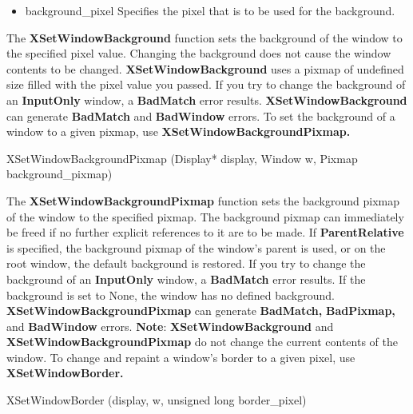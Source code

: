 \documentclass{report}
\begin{document}
\begin{itemize}
            \bigbreak \noindent
            \begin{itemize}
                \item background\_pixel Specifies the pixel that is to be used for the background.
            \end{itemize}
            The \textbf{XSetWindowBackground} function sets the background of the window to the specified pixel value. Changing the background does not cause the window contents to be changed. \textbf{XSetWindowBackground} uses a pixmap of undefined size filled with the pixel value you passed. If you try to change the background of an \textbf{InputOnly} window, a \textbf{BadMatch} error results.
            \bigbreak \noindent 
            \textbf{XSetWindowBackground} can generate \textbf{BadMatch} and \textbf{BadWindow} errors.
            \bigbreak \noindent 
            To set the background of a window to a given pixmap, use \textbf{XSetWindowBackgroundPixmap.}
            \bigbreak \noindent 
            \begin{cppcode}
                XSetWindowBackgroundPixmap (Display* display, Window w, Pixmap background_pixmap)
            \end{cppcode}
            \bigbreak \noindent 
            The \textbf{XSetWindowBackgroundPixmap} function sets the background pixmap of the window to the specified pixmap. The background pixmap can immediately be freed if no further explicit references to it are to be made. If \textbf{ParentRelative} is specified, the background pixmap of the window’s parent is used, or on the root window, the default background is restored. If you try to change the background of an \textbf{InputOnly} window, a \textbf{BadMatch} error results. If the background is set to None, the window has no defined background.
            \bigbreak \noindent 
            \textbf{XSetWindowBackgroundPixmap} can generate \textbf{BadMatch,} \textbf{BadPixmap,} and \textbf{BadWindow} errors.
            \bigbreak \noindent 
            \textbf{Note}: \textbf{XSetWindowBackground} and \textbf{XSetWindowBackgroundPixmap} do not change the current contents of the window.
            \bigbreak \noindent 
            To change and repaint a window’s border to a given pixel, use \textbf{XSetWindowBorder.}
            \bigbreak \noindent 
            \begin{cppcode}
                XSetWindowBorder (display, w, unsigned long border_pixel)
            \end{cppcode}
            \bigbreak \noindent
            \begin{itemize}

\end{itemize}
\end{itemize}
\end{document}
